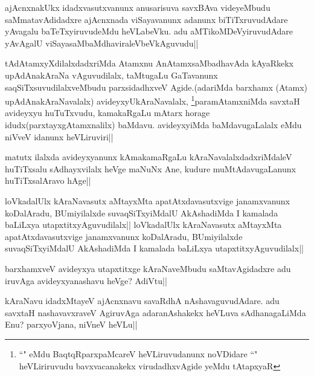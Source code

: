 \begin{artha}
ajAcnxnakUkx idadxvasutxvanunx anusarisuva savxBAva videyeMbudu saMmatavAdidadxre ajAcnxnada viSayavanunx adanunx biTiTxruvudAdare yAvagalu baTeTxyiruvudeMdu heVLabeVku. adu aMTikoMDeVyiruvudAdare yAvAgalU viSayasaMbaMdhaviraleVbeVkAguvudu||
\end{artha}


\begin{artha}
tAdAtamxyXdilalxdadxriMda Atamxnu AnAtamxsaMbadhavAda kAyaRkekx upAdAnakAraNa vAguvudilalx, taMtugaLu GaTavanunx saqSiTxsuvudilalxveMbudu parxsidadhxveV Agide.(adariMda barxhamx (Atamx) upAdAnakAraNavalalx) avideyxyUkAraNavalalx, \footnote{``\stext" eMdu BaqtqRparxpaMcareV heVLiruvudanunx noVDidare ``\stext" heVLiriruvudu bavxvacanakekx virudadhxvAgide yeMdu tAtapxyaR}paramAtamxniMda savxtaH avideyxyu huTuTxvudu, kamakaRgaLu mAtarx horage idudx(parxtayxgAtamxnalilx) baMdavu. avideyxyiMda baMdavugaLalalx eMdu niVveV idanunx heVLiruviri||
\end{artha}


\begin{artha}
matutx ilalxda avideyxyanunx kAmakamaRgaLu kAraNavalalxdadxriMdaleV huTiTxsalu 
sAdhayxvilalx heVge maNuNx Ane, kudure muMtAdavugaLanunx huTiTxsalAravo hAge||
\end{artha}

\begin{artha}
loVkadalUlx kAraNavasutx aMtayxMta apatAtxdavasutxvige janamxvanunx koDalAradu, BUmiyilalxde suvaqSiTxyiMdalU AkAshadiMda I kamalada baLiLxya utapxtitxyAguvudilalx||
loVkadalUlx kAraNavasutx aMtayxMta apatAtxdavasutxvige janamxvanunx koDalAradu, BUmiyilalxde suvaqSiTxyiMdalU AkAshadiMda I kamalada baLiLxya utapxtitxyAguvudilalx||
\end{artha}

\begin{artha}
barxhamxveV avideyxya  utapxtitxge kAraNaveMbudu saMtavAgidadxre adu iruvAga avideyxyanashavu heVge? AdiVtu||
\end{artha}

\begin{artha}
kAraNavu idadxMtayeV ajAcnxnavu savaRdhA nAshavaguvudAdare. adu savxtaH nashavavxraveV AgiruvAga adaranAshakekx heVLuva sAdhanagaLiMda Enu? parxyoVjana, niVneV heVLu||
\end{artha}

